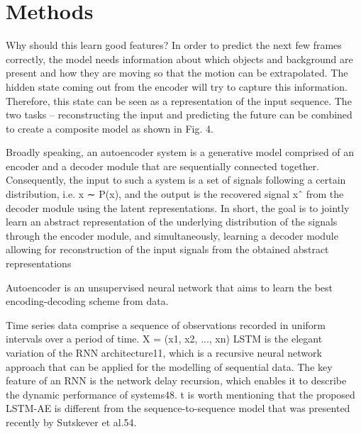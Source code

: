 \section{Methods}
\iffalse
Why should this learn good features? In order to predict the next few frames correctly, the model needs information about which objects and background are present and how they are moving so that the motion can be extrapolated. The hidden state coming out from the encoder will try to capture this information. Therefore, this state can be seen as a representation of the input sequence.
The two tasks – reconstructing the input and predicting the future can be combined to create a composite model as shown in Fig. 4.

Broadly speaking, an autoencoder system is a generative model comprised of an encoder and a decoder module that are sequentially connected together. Consequently, the input to such a system is a set of signals following a certain distribution, i.e. x ∼ P(x), and the output is the recovered signal xˆ from the decoder module using the latent representations. In short, the goal is to jointly learn an abstract representation of the underlying distribution of the signals through the encoder module, and simultaneously, learning a decoder module allowing for reconstruction of the input signals from the obtained abstract representations

Autoencoder is an unsupervised neural network that aims to learn the best encoding-decoding scheme from data.

Time series data comprise a sequence of observations recorded in uniform intervals over a period of time. X = (x1, x2, ..., xn)
LSTM is the elegant variation of the RNN architecture11, which is a recursive neural network approach that can be applied for the modelling of sequential data. The key feature of an RNN is the network delay recursion, which enables it to describe the dynamic performance of systems48. 
t is worth mentioning that the proposed LSTM-AE is different from the sequence-to-sequence model that was presented recently by Sutskever et al.54.


